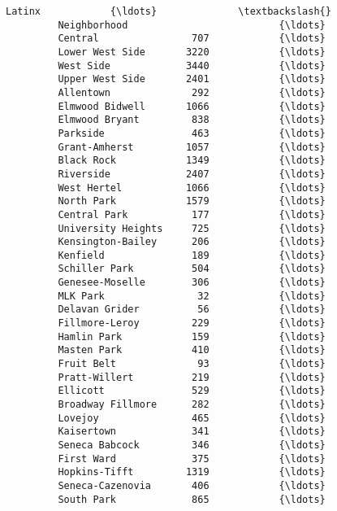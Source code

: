 \documentclass[11pt]{article}
\begin{document}
\begin{Verbatim}[commandchars=\\\{\}]
                             Latinx            {\ldots}              \textbackslash{}
         Neighborhood                          {\ldots}               
         Central                707            {\ldots}               
         Lower West Side       3220            {\ldots}               
         West Side             3440            {\ldots}               
         Upper West Side       2401            {\ldots}               
         Allentown              292            {\ldots}               
         Elmwood Bidwell       1066            {\ldots}               
         Elmwood Bryant         838            {\ldots}               
         Parkside               463            {\ldots}               
         Grant-Amherst         1057            {\ldots}               
         Black Rock            1349            {\ldots}               
         Riverside             2407            {\ldots}               
         West Hertel           1066            {\ldots}               
         North Park            1579            {\ldots}               
         Central Park           177            {\ldots}               
         University Heights     725            {\ldots}               
         Kensington-Bailey      206            {\ldots}               
         Kenfield               189            {\ldots}               
         Schiller Park          504            {\ldots}               
         Genesee-Moselle        306            {\ldots}               
         MLK Park                32            {\ldots}               
         Delavan Grider          56            {\ldots}               
         Fillmore-Leroy         229            {\ldots}               
         Hamlin Park            159            {\ldots}               
         Masten Park            410            {\ldots}               
         Fruit Belt              93            {\ldots}               
         Pratt-Willert          219            {\ldots}               
         Ellicott               529            {\ldots}               
         Broadway Fillmore      282            {\ldots}               
         Lovejoy                465            {\ldots}               
         Kaisertown             341            {\ldots}               
         Seneca Babcock         346            {\ldots}               
         First Ward             375            {\ldots}               
         Hopkins-Tifft         1319            {\ldots}               
         Seneca-Cazenovia       406            {\ldots}               
         South Park             865            {\ldots}               
         

\end{Verbatim}
\end{document}
